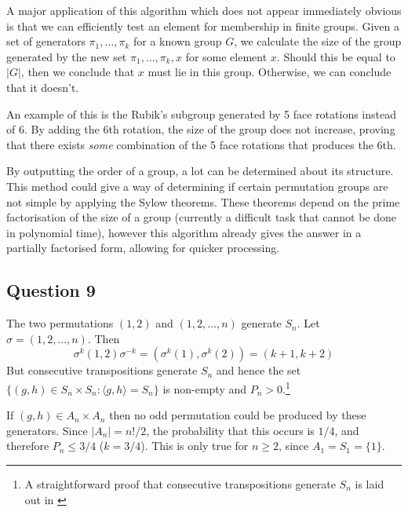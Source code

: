 \documentclass[10pt,a4paper,notitlepage]{article}
\newcommand{\abs}[1]{\lvert#1\rvert}
\begin{document}
A major application of this algorithm which does not appear immediately obvious is that we can efficiently test an element for membership in finite groups. Given a set of generators $\pi_{1},\hdots,\pi_{k}$ for a known group $G$, we calculate the size of the group generated by the new set $\pi_{1},\hdots,\pi_{k}, x$ for some element $x$.  Should this be equal to $\abs{G}$, then we conclude that $x$ must lie in this group. Otherwise, we can conclude that it doesn't. 

An example of this is the Rubik's subgroup generated by 5 face rotations instead of 6. By adding the 6th rotation, the size of the group does not increase, proving that there exists \textit{some} combination of the 5 face rotations that produces the 6th.

By outputting the order of a group, a lot can be determined about its structure. This method could give a way of determining if certain permutation groups are not simple by applying the Sylow theorems. These theorems depend on the prime factorisation of the size of a group (currently a difficult task that cannot be done in polynomial time), however this algorithm already gives the answer in a partially factorised form, allowing for quicker processing.

\subsection*{\centering Question 9}
The two permutations $(1,2)$ and $(1,2,\hdots,n)$ generate $S_{n}$. Let $\sigma=(1,2,\hdots,n)$. Then 
\begin{equation}
\sigma^{k}(1,2)\sigma^{-k}=(\sigma^{k}(1),\sigma^{k}(2))=(k+1,k+2)
\end{equation}
But consecutive transpositions generate $S_{n}$ and hence the set $\lbrace (g,h)\in S_{n}\times S_{n} : \langle g,h\rangle =S_{n}\rbrace$ is non-empty and $P_{n}>0$.\footnote{A straightforward proof that consecutive transpositions generate $S_{n}$ is laid out in \cite{PermStuff}}

If $(g,h)\in A_{n}\times A_{n}$ then no odd permutation could be produced by these generators. Since $\abs{A_{n}}=n!/2$, the probability that this occurs is $1/4$, and therefore $P_{n}\leq 3/4$ ($k=3/4$). This is only true for $n\geq 2$, since $A_{1}=S_{1}=\lbrace 1\rbrace$. \\
\end{document}
